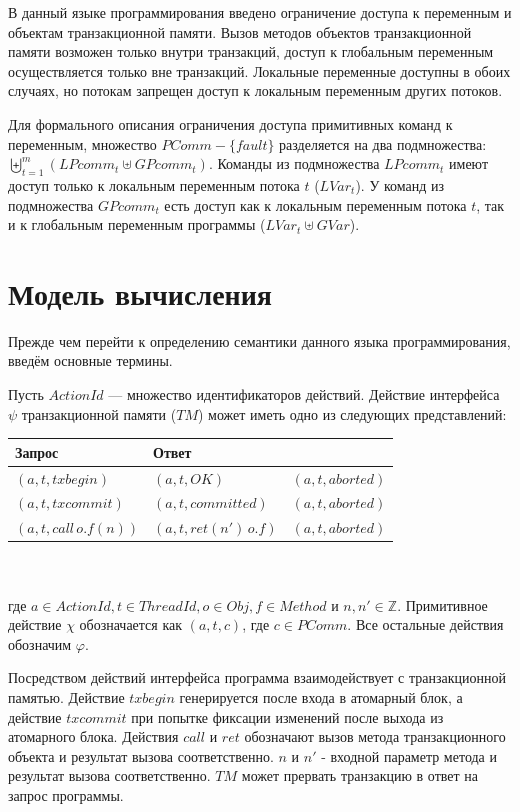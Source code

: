 В данный языке программирования введено ограничение доступа к переменным и объектам транзакционной памяти. Вызов методов объектов транзакционной памяти возможен только внутри транзакций, доступ к глобальным переменным осуществляется только вне транзакций. Локальные переменные доступны в обоих случаях, но потокам запрещен доступ к локальным переменным других потоков.

Для формального описания ограничения доступа примитивных команд к переменным, множество $PComm - \{fault\}$ разделяется на два подмножества: $\biguplus_{t=1}^m (LPcomm_t \uplus GPcomm_t)$. Команды из подмножества $LPcomm_t$ имеют доступ только к локальным переменным потока $t$ ($LVar_t$). У команд из подмножества $GPcomm_t$ есть доступ как к локальным переменным потока $t$, так и к глобальным переменным программы ($LVar_t \uplus GVar$). 

\section{Модель вычисления}
Прежде чем перейти к определению семантики данного языка программирования, введём основные термины. 

\begin{mydefinition}\label{def1} Пусть $ActionId$ --- множество идентификаторов действий. Действие интерфейса $\psi$ транзакционной памяти ($TM$) может иметь одно из следующих представлений:\\

\begin{tabular}{llr}
\hline
Запрос  & Ответ \\
\hline
$(a, t, txbegin)$ & $(a, t, OK)$ & $(a, t, aborted)$     \\
$(a, t, txcommit)$ & $(a, t, committed)$ & $(a, t, aborted)$ \\
$(a, t, call \, o.f(n))$ & $(a, t, ret (n') \, o.f)$ & $(a, t, aborted)$ \\
\hline
\end{tabular}\\
\\
где $a \in ActionId, t \in ThreadId, o \in Obj, f \in Method$ и $n,n' \in \mathbb{Z}$. Примитивное действие $\chi$ обозначается как $(a, t, c)$, где $c \in PComm$. Все остальные действия обозначим $\varphi$.
\end{mydefinition}
Посредством действий интерфейса программа взаимодействует с транзакционной памятью.
Действие $txbegin$ генерируется после входа в атомарный блок, а действие $txcommit$ при попытке фиксации изменений после выхода из атомарного блока. Действия $call$ и $ret$ обозначают вызов метода транзакционного объекта и результат вызова соответственно. $n$ и $n'$ - входной параметр метода и результат вызова соответственно. $TM$ может прервать транзакцию в ответ на запрос программы.

